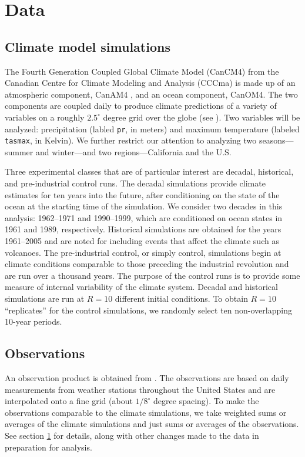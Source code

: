 \section{Data}
\label{process}

\subsection{Climate model simulations}

The Fourth Generation Coupled Global Climate Model (CanCM4) from the Canadian Centre for Climate Modeling and Analysis (CCCma) is made up of an atmospheric component, CanAM4 \citep{von2013canadian}, and an ocean component, CanOM4. The two components are coupled daily to produce climate predictions of a variety of variables on a roughly $2.5^\circ$ degree grid over the globe (see \cite{merryfield2013canadian}). Two variables will be analyzed: precipitation (labled \texttt{pr}, in meters) and maximum temperature (labeled \texttt{tasmax}, in Kelvin). We further restrict our attention to analyzing two seasons---summer and winter---and two regions---California and the U.S.

Three experimental classes that are of particular interest are decadal, historical, and pre-industrial control runs. The decadal simulations provide climate estimates for ten years into the future, after conditioning on the state of the ocean at the starting time of the simulation. We consider two decades in this analysis: 1962--1971 and 1990--1999, which are conditioned on ocean states in 1961 and 1989, respectively. Historical simulations are obtained for the years 1961--2005 and are noted for including events that affect the climate such as volcanoes. The pre-industrial control, or simply control, simulations begin at climate conditions comparable to those preceding the industrial revolution and are run over a thousand years. The purpose of the control runs is to provide some measure of internal variability of the climate system. Decadal and historical simulations are run at $R=10$ different initial conditions. To obtain $R=10$ ``replicates'' for the control simulations, we randomly select ten non-overlapping 10-year periods.

\subsection{Observations}

An observation product is obtained from \cite{maurer2002long}. The observations are based on daily measurements from weather stations throughout the United States and are interpolated onto a fine grid (about $1/8^\circ$ degree spacing). To make the observations comparable to the climate simulations, we take weighted sums or averages of the climate simulations and just sums or averages of the observations. See section \ref{process} for details, along with other changes made to the data in preparation for analysis.

